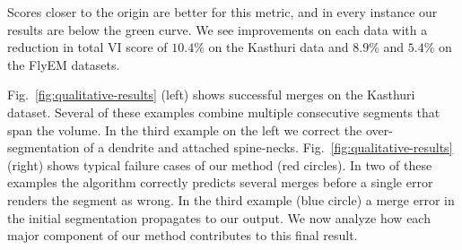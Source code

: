 Scores closer to the origin are better for this metric, and in every instance our results are below the green curve.
We see improvements on each data with a reduction in total VI score of $10.4\%$ on the Kasthuri data and $8.9\%$ and $5.4\%$ on the FlyEM datasets.

Fig.~\ref{fig:qualitative-results} (left) shows successful merges on the Kasthuri dataset. 
Several of these examples combine multiple consecutive segments that span the volume.
In the third example on the left we correct the over-segmentation of a dendrite and attached spine-necks.
Fig.~\ref{fig:qualitative-results} (right) shows typical failure cases of our method (red circles).
In two of these examples the algorithm correctly predicts several merges before a single error renders the segment as wrong.
In the third example (blue circle) a merge error in the initial segmentation propagates to our output.
We now analyze how each major component of our method contributes to this final result.

